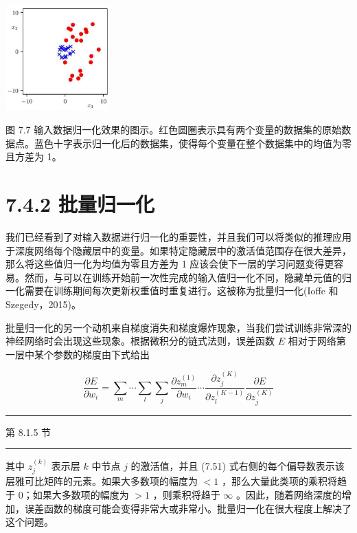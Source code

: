 \documentclass[10pt]{report}
\newcommand{\HRule}{\begin{center}\rule{0.9\linewidth}{0.2mm}\end{center}}
\begin{document}
\begin{center}
\includegraphics[max width=0.3\textwidth]{images/0194e279-9b28-703a-88f4-c3ac21e2010d_245_1079_1500_474_478_0.jpg}
\end{center}
\hspace*{3em} 

图 7.7 输入数据归一化效果的图示。红色圆圈表示具有两个变量的数据集的原始数据点。蓝色十字表示归一化后的数据集，使得每个变量在整个数据集中的均值为零且方差为 1。

\section*{7.4.2 批量归一化}

我们已经看到了对输入数据进行归一化的重要性，并且我们可以将类似的推理应用于深度网络每个隐藏层中的变量。如果特定隐藏层中的激活值范围存在很大差异，那么将这些值归一化为均值为零且方差为 1 应该会使下一层的学习问题变得更容易。然而，与可以在训练开始前一次性完成的输入值归一化不同，隐藏单元值的归一化需要在训练期间每次更新权重值时重复进行。这被称为批量归一化(Ioffe 和 Szegedy，2015)。

批量归一化的另一个动机来自梯度消失和梯度爆炸现象，当我们尝试训练非常深的神经网络时会出现这些现象。根据微积分的链式法则，误差函数 \(E\) 相对于网络第一层中某个参数的梯度由下式给出

\[
\frac{\partial E}{\partial {w}_{i}} = \mathop{\sum }\limits_{m}\cdots \mathop{\sum }\limits_{l}\mathop{\sum }\limits_{j}\frac{\partial {z}_{m}^{\left( 1\right) }}{\partial {w}_{i}}\cdots \frac{\partial {z}_{j}^{\left( K\right) }}{\partial {z}_{l}^{\left( K - 1\right) }}\frac{\partial E}{\partial {z}_{j}^{\left( K\right) }} \tag{7.51}
\]

\HRule

第 8.1.5 节

\HRule

其中 \({z}_{j}^{\left( k\right) }\) 表示层 \(k\) 中节点 \(j\) 的激活值，并且 (7.51) 式右侧的每个偏导数表示该层雅可比矩阵的元素。如果大多数项的幅度为 \(< 1\) ，那么大量此类项的乘积将趋于 0；如果大多数项的幅度为 \(> 1\) ，则乘积将趋于 \(\infty\) 。因此，随着网络深度的增加，误差函数的梯度可能会变得非常大或非常小。批量归一化在很大程度上解决了这个问题。
\end{document}

